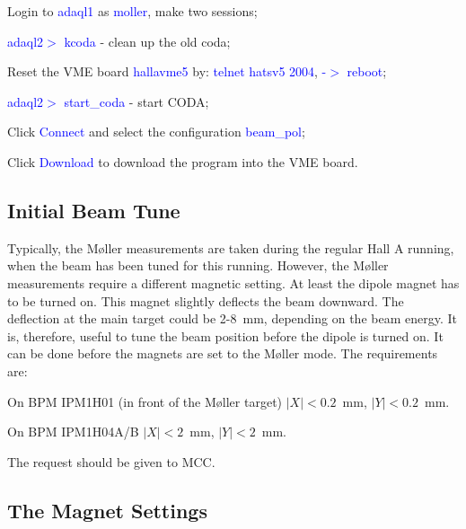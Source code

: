 {\begin{list}{--}{\setlength{\itemsep}{-0.15cm}}
   \item Login to \textcolor{blue}{adaql1} as \textcolor{blue}{moller}, make two sessions;
   \item \textcolor{blue}{adaql2$>$ kcoda} - clean up the old coda;
   \item Reset the VME board \textcolor{blue}{hallavme5} by: 
   \textcolor{blue}{telnet hatsv5 2004}, \textcolor{blue}{-$>$ reboot};  
   \item \textcolor{blue}{adaql2$>$ start\_coda} - start CODA;
   \item Click \textcolor{blue}{Connect} and select the configuration \textcolor{blue}{beam\_pol};
   \item Click \textcolor{blue}{Download} to download the program into the VME board.
 \end{list}

\subsection {Initial Beam Tune}
\label{sec:moller_oper_initbeam}

 Typically, the M{\o}ller measurements are taken during the regular Hall A
 running, when the beam has been tuned for this running. However,
 the M{\o}ller measurements require a different magnetic setting.
 At least the dipole magnet has to be turned on. This magnet
 slightly deflects the beam downward. The deflection at the main target
 could be 2-8~mm, depending on the beam energy. It is, therefore, 
 useful to tune the beam position before the dipole is turned on. It can be done
 before the magnets are set to the M{\o}ller mode.
 The requirements are: 
 \begin{list}{--}{\setlength{\itemsep}{-0.15cm}}
   \item On BPM IPM1H01 (in front of the M{\o}ller target) $|X|<0.2$~mm, $|Y|<0.2$~mm.
   \item On BPM IPM1H04A/B $|X|<2$~mm, $|Y|<2$~mm.
 \end{list}
 The request should be given to MCC. 

\subsection {The Magnet Settings}
\label{sec:moller_oper_magset}

}

